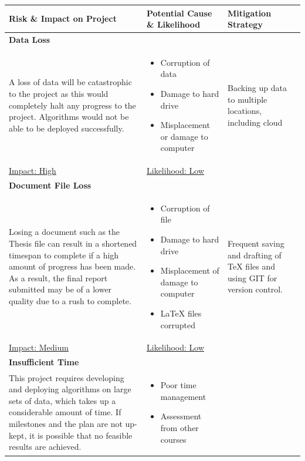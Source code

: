 \documentclass[12pt]{article}
\begin{document}
{\begin{table}[H]
\begin{adjustwidth}{-.5in}{-.5in}  
\begin{center}
\begin{tabular}{|>{\RaggedRight}p{}|>{\RaggedRight}p{}|>{\RaggedRight}p{}|}
\hline
Risk \& Impact on Project & Potential Cause \& Likelihood & Mitigation Strategy\\
\hline
\textbf{Data Loss} & &\\
A loss of data will be catastrophic to the project as this would completely halt any progress to the project. Algorithms would not be able to be deployed successfully.
&
\begin{itemize}
\item Corruption of data
\item Damage to hard drive
\item Misplacement or damage to computer
\end{itemize} 
&  Backing up data to multiple locations, including cloud \\
\underline{Impact: High} & \underline{Likelihood: Low} & \\
\hline
\textbf{Document File Loss} & &\\
Losing a document such as the Thesis file can result in a shortened timespan to complete if a high amount of progress has been made. As a result, the final report submitted may be of a lower quality due to a rush to complete. & \begin{itemize}
\item Corruption of file
\item Damage to hard drive
\item Misplacement of damage to computer
\item LaTeX files corrupted
\end{itemize} & Frequent saving and drafting of TeX files and using GIT for version control.\\
\underline{Impact: Medium} & \underline{Likelihood: Low} &\\
\hline
\textbf{Insufficient Time} & &\\
This project requires developing and deploying algorithms on large sets of data, which takes up a considerable amount of time. If milestones and the plan are not up-kept, it is possible that no feasible results are achieved. & \begin{itemize}
\item Poor time management
\item Assessment from other courses

\end{itemize}
\end{tabular}
\end{center}
\end{adjustwidth}
\end{table}}
\end{document}
